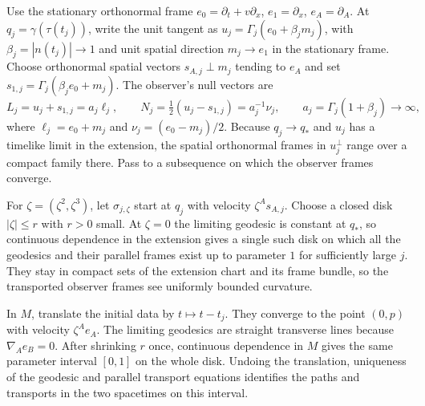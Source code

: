 \documentclass[12pt]{article}
\begin{document}
Use the stationary orthonormal frame
\(e_0=\partial_t+v\partial_x\), \(e_1=\partial_x\), \(e_A=\partial_A\).
At \(q_j=\gamma(\tau(t_j))\), write the unit tangent as
\(u_j=\Gamma_j(e_0+\beta_j m_j)\), with \(\beta_j=|n(t_j)|\to1\) and
unit spatial direction \(m_j\to e_1\) in the stationary frame.
Choose orthonormal spatial vectors \(s_{A,j}\perp m_j\) tending to
\(e_A\) and set \(s_{1,j}=\Gamma_j(\beta_j e_0+m_j)\). The observer's
null vectors are
\begin{equation}
 L_j=u_j+s_{1,j}=a_j\ell_j,\qquad
 N_j=\tfrac12(u_j-s_{1,j})=a_j^{-1}\nu_j,\qquad
 a_j=\Gamma_j(1+\beta_j)\to\infty,
 \label{boost}
\end{equation}
where \(\ell_j=e_0+m_j\) and \(\nu_j=(e_0-m_j)/2\).
Because \(q_j\to q_*\) and \(u_j\) has a timelike limit in the extension,
the spatial orthonormal frames in \(u_j^\perp\) range over a compact
family there. Pass to a subsequence on which the observer frames converge.

For \(\zeta=(\zeta^2,\zeta^3)\), let \(\sigma_{j,\zeta}\) start at
\(q_j\) with velocity \(\zeta^A s_{A,j}\). Choose a closed disk
\(|\zeta|\leq r\) with \(r>0\) small. At \(\zeta=0\) the limiting
geodesic is constant at \(q_*\), so continuous dependence in the
extension gives a single such disk on which all the geodesics and
their parallel frames exist up to parameter \(1\) for sufficiently
large \(j\). They stay in compact sets of the extension chart and
its frame bundle, so the transported observer frames see uniformly
bounded curvature.

In \(M\), translate the initial data by \(t\mapsto t-t_j\). They
converge to the point \((0,p)\) with velocity \(\zeta^A e_A\).
The limiting geodesics are straight transverse lines because
\(\nabla_A e_B=0\). After shrinking \(r\) once, continuous dependence
in \(M\) gives the same parameter interval \([0,1]\) on the whole
disk. Undoing the translation, uniqueness of the geodesic and
parallel transport equations identifies the paths and transports
in the two spacetimes on this interval.
\end{document}
